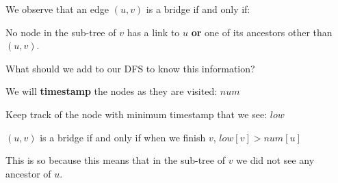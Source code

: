 \documentclass[10pt]{beamer}
\begin{document}


\begin{frame}

We observe that an edge $(u, v)$ is a bridge if and only if:

\vspace{0.5cm}

No node in the sub-tree of $v$ has {\color{cyan} a link to $u$} \textbf{or} {\color{red} one of its ancestors other than $(u, v)$}.

\vspace{0.5cm}

\begin{center}
\end{center}

What should we add to our DFS to know this information?

\end{frame}


\begin{frame}

We will \textbf{timestamp} the nodes as they are visited: $num$

\vspace{0.5cm}

Keep track of the node with minimum timestamp that we see: $low$

\vspace{0.5cm}

$(u, v)$ is a bridge if and only if when we finish $v$, $low[v] > num[u]$

\vspace{0.5cm}

This is so because this means that in the sub-tree of $v$ we did not see any
ancestor of $u$.

\end{frame}
\end{document}
